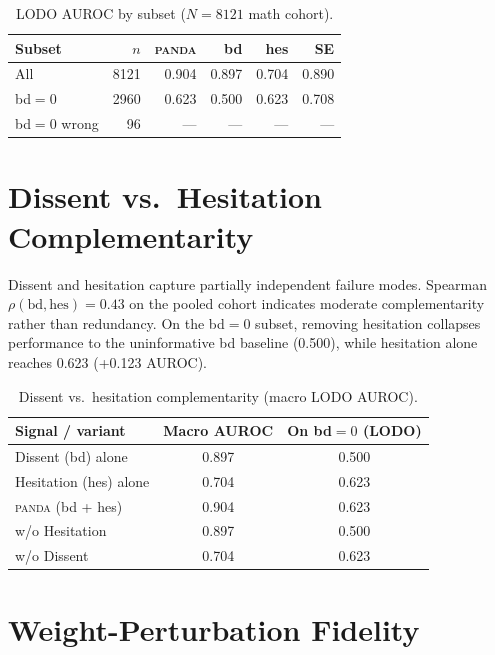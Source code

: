 \documentclass{article} %
\DeclareRobustCommand{\method}{%
  \texorpdfstring{%
    \ifmmode\text{\normalfont\textsc{panda}}\else\textsc{panda}\xspace\fi
  }{PANDA}%
}
\begin{document}
\begin{table}[t]
  \centering
  \small
  \caption{LODO AUROC by subset ($N{=}8121$ math cohort).}
  \label{tab:app-subsets}
  \begin{tabular}{lrrrrr}
    \toprule
    Subset & $n$ & \method{} & bd & hes & SE \\
    \midrule
    All      & 8121 & 0.904 & 0.897 & 0.704 & 0.890 \\
    bd$=0$   & 2960 & 0.623 & 0.500 & 0.623 & 0.708 \\
    bd$=0$ wrong & 96 & --- & --- & --- & --- \\
    \bottomrule
  \end{tabular}
\end{table}


\section{Dissent vs.\ Hesitation Complementarity}
\label{app:complementarity}

Dissent and hesitation capture partially independent failure modes.
Spearman $\rho(\mathrm{bd},\mathrm{hes}){=}0.43$ on the pooled cohort indicates moderate complementarity rather than redundancy.
On the bd$=0$ subset, removing hesitation collapses performance to the uninformative bd baseline (0.500), while hesitation alone reaches 0.623 (+0.123 AUROC).

\begin{table}[t]
  \centering
  \small
  \caption{Dissent vs.\ hesitation complementarity (macro LODO AUROC).}
  \label{tab:app-complementarity}
  \begin{tabular}{lcc}
    \toprule
    Signal / variant & Macro AUROC & On bd$=0$ (LODO) \\
    \midrule
    Dissent (bd) alone        & 0.897 & 0.500 \\
    Hesitation (hes) alone    & 0.704 & 0.623 \\
    \method{} (bd + hes)      & 0.904 & 0.623 \\
    w/o Hesitation            & 0.897 & 0.500 \\
    w/o Dissent               & 0.704 & 0.623 \\
    \bottomrule
  \end{tabular}
\end{table}


\section{Weight-Perturbation Fidelity}
\label{app:weight-fidelity}
\end{document}
